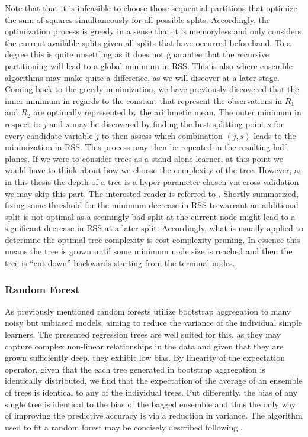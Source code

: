 \documentclass[a4paper,12pt, headsepline]{scrartcl}
\numberwithin{equation}{section}
\begin{document}
Note that that it is infeasible to choose those sequential partitions that optimize the sum of squares simultaneously for all possible splits. Accordingly, the optimization process is greedy in a sense that it is memoryless and only considers the current available splits given all splits that have occurred beforehand. To a degree this is quite unsettling as it does not guarantee that the recursive partitioning will lead to a global minimum in RSS. This is also where ensemble algorithms may make quite a difference, as we will discover at a later stage. Coming back to the greedy minimization, we have previously discovered that the inner minimum in regards to the constant that represent the observations in $R_1$ and $R_2$ are optimally represented by the arithmetic mean. The outer minimum in respect to $j$ and $s$ may be discovered by  finding the best splitting point $s$ for every candidate variable $j$ to then assess which combination $(j, s)$ leads to the minimization in RSS. This process may then be repeated in the resulting half-planes. If we were to consider trees as a stand alone learner, at this point we would have to think about how we choose the complexity of the tree. However, as in this thesis the depth of a tree is a hyper parameter chosen via cross validation we may skip this part. The interested reader is referred to \citet{hastie09}. Shortly summarized, fixing some threshold for the minimum decrease in RSS to warrant an additional split is not optimal as a seemingly bad split at the current node  might lead to a significant decrease in RSS at a later split. Accordingly, what is usually applied to determine the optimal tree complexity is cost-complexity pruning. In essence this means the tree is grown until some minimum node size is reached and then the tree is \enquote{cut down} backwards starting from the terminal nodes.

\subsubsection{Random Forest}\label{subsubsec:rf}
As previously mentioned random forests utilize bootstrap aggregation to many noisy but unbiased models, aiming to reduce the variance of the individual simple learners. The presented regression trees are well suited for this, as they may capture complex non-linear relationships in the data and given that they are grown sufficiently deep, they exhibit low bias. By linearity of the expectation operator, given that the each tree generated in bootstrap aggregation is identically distributed, we find that the expectation of the average of an ensemble of trees is identical to any of the individual trees. Put differently, the bias of any single tree is identical to the bias of the bagged ensemble and thus the only way of improving the predictive accuracy is via a reduction in variance. The algorithm used to fit a random forest may be concisely described following \citet{hastie09}.
\end{document}
